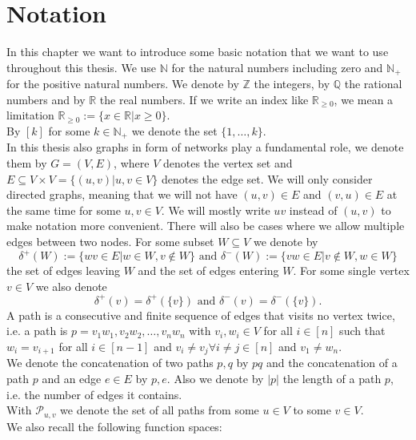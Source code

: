 \documentclass[reqno,openany]{amsbook}
\theoremstyle{definition}
\theoremstyle{plain}
\begin{document}
\chapter{Notation}
In this chapter we want to introduce some basic notation that we want to use throughout this thesis. We use $\mathbb{N}$ for the natural numbers including zero and $\mathbb{N}_+$ for the positive natural numbers. We denote by $\mathbb{Z}$ the integers, by $\mathbb{Q}$ the rational numbers and by $\mathbb{R}$ the real numbers. If we write an index like $\mathbb{R}_{\geq 0}$, we mean a limitation $\mathbb{R}_{\geq 0} := \{ x \in \mathbb{R} \vert x \geq 0\}$. \\
By $[k]$ for some $k \in \mathbb{N}_+$ we denote the set $\{1, \dots, k\}$.\\
In this thesis also graphs in form of networks play a fundamental role, we denote them by $G = (V, E)$, where $V$ denotes the vertex set and $E \subseteq V \times V = \{ (u,v) \vert u, v \in V\}$ denotes the edge set. We will only consider directed graphs, meaning that we will not have $(u, v) \in E $ and $(v, u) \in E$ at the same time for some $u, v \in V$. We will mostly write $uv$ instead of $(u , v)$ to make notation more convenient. There will also be cases where we allow multiple edges between two nodes. For some subset $W \subseteq V$ we denote by \[ \delta^+(W) := \{ wv \in E \vert w \in W, v \notin W\} \text{       and        } \delta^-(W) := \{ vw \in E \vert v \notin W, w \in W\} \] the set of edges leaving $W$ and the set of edges entering $W$. For some single vertex $v \in V$ we also denote \[ \delta^+(v) = \delta^+(\{v\}) \text{     and     } \delta^-(v) = \delta^-(\{v\}).\]
A path is a consecutive and finite sequence of edges that visits no vertex twice, i.e. a path is $p = v_1w_1, v_2w_2, \dots, v_nw_n$ with $v_i, w_i \in V$ for all $i \in [n]$ such that $w_i = v_{i+1}$ for all $i \in [n-1]$ and $v_i \neq v_j \forall i \neq j \in [n]$ and $v_1 \neq w_n$.\\
We denote the concatenation of two paths $p, q$ by $pq$ and the concatenation of a path $p$ and an edge $e \in E$ by $p,e$. Also we denote by $\lvert p \rvert$ the length of a path $p$, i.e. the number of edges it contains. \\
With $\mathcal{P}_{u,v}$ we denote the set of all paths from some $u \in V$ to some $v \in V$.\\
We also recall the following function spaces: \\
\end{document}
